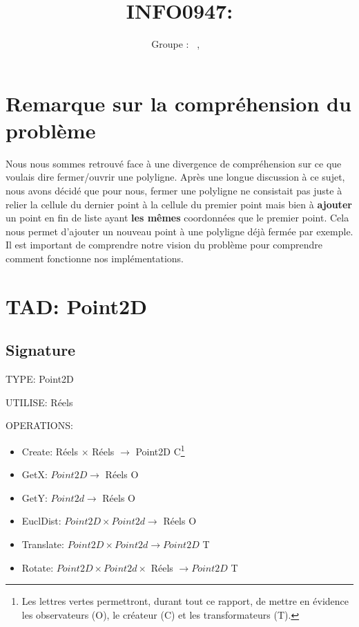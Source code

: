 \documentclass[a4paper, 11pt, oneside]{article}
\title{INFO0947: \intitule}
\author{Groupe \GrNbr : \PrenomUN~\textsc{\NomUN}, \PrenomDEUX~\textsc{\NomDEUX}}
\date{}
\newcommand{\tablemat}{~}
\renewcommand{\tablemat}{\tableofcontents}
\begin{document}
\maketitle
\newpage
\tablemat
\newpage

\section{Remarque sur la compréhension du problème}
Nous nous sommes retrouvé face à une divergence de compréhension sur ce que voulais dire fermer/ouvrir une polyligne. Après une  longue discussion à ce sujet, nous avons décidé que pour nous, fermer une polyligne ne consistait pas juste à relier la cellule du dernier point à la cellule du premier point mais bien à \textbf{ajouter} un point en fin de liste ayant \textbf{les mêmes} coordonnées que le premier point. Cela nous permet d'ajouter un nouveau point à une polyligne déjà fermée par exemple. Il est important de comprendre notre vision du problème pour comprendre comment fonctionne nos implémentations.


\section{TAD: Point2D}

\subsection{Signature}

\noindent TYPE: Point2D

\noindent UTILISE: Réels 

\noindent OPERATIONS: 
\begin{itemize}
    \item Create: Réels $\times$ Réels $\xrightarrow{}$ Point2D {\color{green} C}\footnote{Les lettres vertes permettront, durant tout ce rapport, de mettre en évidence les observateurs (O), le créateur (C) et les transformateurs (T).}
    \item GetX: $Point2D \xrightarrow{}$ Réels {\color{green} O}
    \item GetY: $Point2d \xrightarrow{}$ Réels {\color{green} O}
    \item EuclDist: $Point2D \times Point2d \xrightarrow{}$ Réels {\color{green} O}
    \item Translate: $Point2D \times Point2d \xrightarrow{} Point2D$ {\color{green} T}
    \item Rotate: $Point2D \times Point2d  \times $ Réels $\xrightarrow{} Point2D $ {\color{green} T}
\end{itemize}
\end{document}
